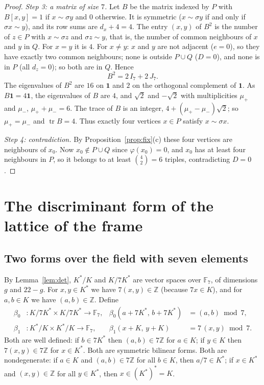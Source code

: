 \documentclass[11pt,a4paper]{article}
\theoremstyle{definition}
\theoremstyle{remark}
\newcommand{\ZZ}{\mathbb{Z}}
\newcommand{\FF}{\mathbb{F}}
\newcommand{\one}{\mathbf{1}}
\newcommand{\sg}{\sigma}
\newcommand{\tr}{\operatorname{tr}}
\begin{document}
\begin{proof}
\medskip\noindent\emph{Step 3: a matrix of size $7$.}
Let $B$ be the matrix indexed by $P$ with $B[x,y]=1$ if $x\sim\sg y$ and $0$ otherwise. It is symmetric
($x\sim\sg y$ if and only if $\sg x\sim y$), and its row sums are $d_x+4=4$. The entry $(x,y)$ of $B^2$ is the number
of $z\in P$ with $x\sim\sg z$ and $\sg z\sim y$, that is, the number of common neighbours of $x$ and $y$ in $Q$. For
$x=y$ it is $4$. For $x\ne y$: $x$ and $y$ are not adjacent ($e=0$), so they have exactly two common neighbours;
none is outside $P\cup Q$ ($D=0$), and none is in $P$ (all $d_z=0$); so both are in $Q$. Hence
\[
B^2=2\,I_7+2\,J_7 .
\]
The eigenvalues of $B^2$ are $16$ on $\one$ and $2$ on the orthogonal complement of $\one$. As $B\one=4\one$, the
eigenvalues of $B$ are $4$, and $\sqrt2$ and $-\sqrt2$ with multiplicities $\mu_+$ and $\mu_-$, $\mu_++\mu_-=6$. The
trace of $B$ is an integer, $4+(\mu_+-\mu_-)\sqrt2$; so $\mu_+=\mu_-$ and $\tr B=4$. Thus exactly four vertices
$x\in P$ satisfy $x\sim\sg x$.

\medskip\noindent\emph{Step 4: contradiction.}
By Proposition~\ref{prop:fix}(c) these four vertices are neighbours of $x_0$. Now $x_0\notin P\cup Q$ since
$\varphi(x_0)=0$, and $x_0$ has at least four neighbours in $P$, so it belongs to at least $\binom42=6$ triples,
contradicting $D=0$.
\end{proof}

\section{The discriminant form of the lattice of the frame}\label{sec:disc}

\subsection{Two forms over the field with seven elements}
By Lemma~\ref{lem:det}, $K^*/K$ and $K/7K^*$ are vector spaces over $\FF_7$, of dimensions $g$ and $22-g$. For
$x,y\in K^*$ we have $7(x,y)\in\ZZ$ (because $7x\in K$), and for $a,b\in K$ we have $(a,b)\in\ZZ$. Define
\begin{align*}
\beta_0&:K/7K^*\times K/7K^*\to\FF_7,&\beta_0(a+7K^*,\,b+7K^*)&=(a,b)\bmod7,\\
\beta_1&:K^*/K\times K^*/K\to\FF_7,&\beta_1(x+K,\,y+K)&=7\,(x,y)\bmod7 .
\end{align*}
Both are well defined: if $b\in7K^*$ then $(a,b)\in7\ZZ$ for $a\in K$; if $y\in K$ then $7(x,y)\in7\ZZ$ for
$x\in K^*$. Both are symmetric bilinear forms. Both are nondegenerate: if $a\in K$ and $(a,b)\in7\ZZ$ for all
$b\in K$, then $a/7\in K^*$; if $x\in K^*$ and $(x,y)\in\ZZ$ for all $y\in K^*$, then $x\in(K^*)^*=K$.
\end{document}

